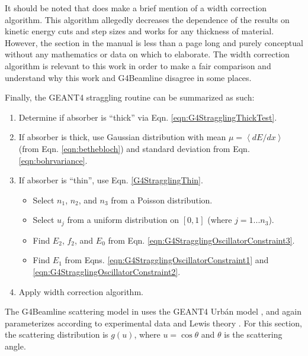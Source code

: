 It should be noted that \cite{geant4} does make a brief mention of a width correction algorithm. This algorithm allegedly decreases the dependence of the results on kinetic energy cuts and step sizes and works for any thickness of material. However, the section in the manual is less than a page long and purely conceptual without any mathematics or data on which to elaborate. The width correction algorithm is relevant to this work in order to make a fair comparison and understand why this work and G4Beamline disagree in some places.

Finally, the GEANT4 straggling routine can be summarized as such:
\begin{enumerate}
\item{Determine if absorber is ``thick'' via Eqn. \ref{eqn:G4StragglingThickTest}.}
\item{If absorber is thick, use Gaussian distribution with mean $\mu = \left<dE/dx\right>$ (from Eqn. \ref{eqn:bethebloch}) and standard deviation from Eqn. \ref{eqn:bohrvariance}.}
\item{If absorber is ``thin'', use Eqn. \ref{G4StragglingThin}.
	\begin{itemize}
	\item{Select $n_1$, $n_2$, and $n_3$ from a Poisson distribution.}
	\item{Select $u_j$ from a uniform distribution on $[0,1]$ (where $j=1...n_3$).}
	\item{Find $E_2$, $f_2$, and $E_0$ from Eqn. \ref{eqn:G4StragglingOscillatorConstraint3}.} 
	\item{Find $E_1$ from Eqns. \ref{eqn:G4StragglingOscillatorConstraint1} and \ref{eqn:G4StragglingOscillatorConstraint2}.}
	\end{itemize}
	}
\item{Apply width correction algorithm.}
\end{enumerate}
 \label{sec:g4blscattering}\par
The G4Beamline scattering model in \cite{g4bl} uses the GEANT4 Urb\'{a}n model \cite{geant4}, and again parameterizes according to experimental data and Lewis theory \cite{lewis}. For this section, the scattering distribution is $g(u)$, where $u=\cos\theta$ and $\theta$ is the scattering angle.

